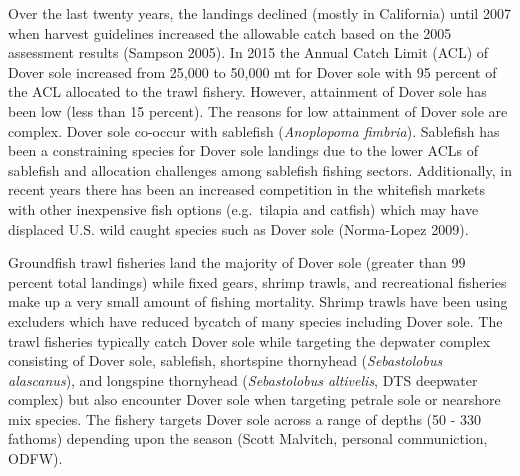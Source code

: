 \documentclass[11pt,
  english,
  a4paper,
]{article}
\begin{document}
\leavevmode\tagmcend\tagstructend\par


Over the last twenty years, the landings declined (mostly in California) until 2007 when harvest guidelines increased the allowable catch based on the 2005 assessment results {(Sampson 2005)\leavevmode\tagmcend\tagstructend}. In 2015 the Annual Catch Limit (ACL) of Dover sole increased from 25,000 to 50,000 mt for Dover sole with 95 percent of the ACL allocated to the trawl fishery. However, attainment of Dover sole has been low (less than 15 percent). The reasons for low attainment of Dover sole are complex. Dover sole co-occur with sablefish (\emph{Anoplopoma fimbria}). Sablefish has been a constraining species for Dover sole landings due to the lower ACLs of sablefish and allocation challenges among sablefish fishing sectors. Additionally, in recent years there has been an increased competition in the whitefish markets with other inexpensive fish options (e.g.~tilapia and catfish) which may have displaced U.S. wild caught species such as Dover sole {(Norma-Lopez 2009)\leavevmode\tagmcend\tagstructend}.

\leavevmode\tagmcend\tagstructend\par


Groundfish trawl fisheries land the majority of Dover sole (greater than 99 percent total landings) while fixed gears, shrimp trawls, and recreational fisheries make up a very small amount of fishing mortality. Shrimp trawls have been using excluders which have reduced bycatch of many species including Dover sole. The trawl fisheries typically catch Dover sole while targeting the depwater complex consisting of Dover sole, sablefish, shortspine thornyhead (\emph{Sebastolobus alascanus}), and longspine thornyhead (\emph{Sebastolobus altivelis}, DTS deepwater complex) but also encounter Dover sole when targeting petrale sole or nearshore mix species. The fishery targets Dover sole across a range of depths (50 - 330 fathoms) depending upon the season (Scott Malvitch, personal communiction, ODFW).

\leavevmode\tagmcend\tagstructend\par

\end{document}
